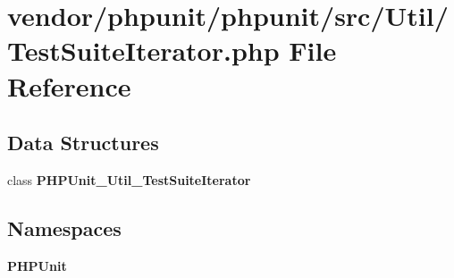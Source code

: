 \section{vendor/phpunit/phpunit/src/\+Util/\+Test\+Suite\+Iterator.php File Reference}
\label{_test_suite_iterator_8php}
\subsection*{Data Structures}
\begin{DoxyCompactItemize}
\item 
class {\bf P\+H\+P\+Unit\+\_\+\+Util\+\_\+\+Test\+Suite\+Iterator}
\end{DoxyCompactItemize}
\subsection*{Namespaces}
\begin{DoxyCompactItemize}
\item 
 {\bf P\+H\+P\+Unit}
\end{DoxyCompactItemize}

